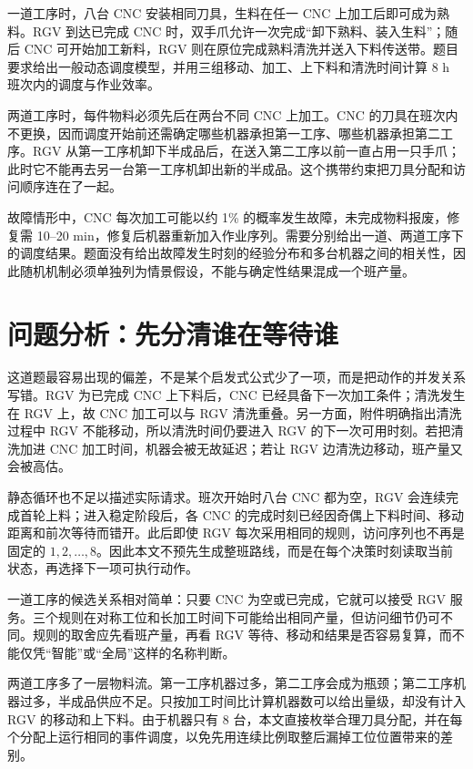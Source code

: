 \documentclass[UTF8,11pt,a4paper]{ctexart}
\begin{document}
一道工序时，八台 CNC 安装相同刀具，生料在任一 CNC 上加工后即可成为熟料。RGV 到达已完成 CNC 时，双手爪允许一次完成“卸下熟料、装入生料”；随后 CNC 可开始加工新料，RGV 则在原位完成熟料清洗并送入下料传送带。题目要求给出一般动态调度模型，并用三组移动、加工、上下料和清洗时间计算 8 h 班次内的调度与作业效率。

两道工序时，每件物料必须先后在两台不同 CNC 上加工。CNC 的刀具在班次内不更换，因而调度开始前还需确定哪些机器承担第一工序、哪些机器承担第二工序。RGV 从第一工序机卸下半成品后，在送入第二工序以前一直占用一只手爪；此时它不能再去另一台第一工序机卸出新的半成品。这个携带约束把刀具分配和访问顺序连在了一起。

故障情形中，CNC 每次加工可能以约 1\% 的概率发生故障，未完成物料报废，修复需 10--20 min，修复后机器重新加入作业序列。需要分别给出一道、两道工序下的调度结果。题面没有给出故障发生时刻的经验分布和多台机器之间的相关性，因此随机机制必须单独列为情景假设，不能与确定性结果混成一个班产量。

\section{问题分析：先分清谁在等待谁}

这道题最容易出现的偏差，不是某个启发式公式少了一项，而是把动作的并发关系写错。RGV 为已完成 CNC 上下料后，CNC 已经具备下一次加工条件；清洗发生在 RGV 上，故 CNC 加工可以与 RGV 清洗重叠。另一方面，附件明确指出清洗过程中 RGV 不能移动，所以清洗时间仍要进入 RGV 的下一次可用时刻。若把清洗加进 CNC 加工时间，机器会被无故延迟；若让 RGV 边清洗边移动，班产量又会被高估。

静态循环也不足以描述实际请求。班次开始时八台 CNC 都为空，RGV 会连续完成首轮上料；进入稳定阶段后，各 CNC 的完成时刻已经因奇偶上下料时间、移动距离和前次等待而错开。此后即使 RGV 每次采用相同的规则，访问序列也不再是固定的 $1,2,\ldots,8$。因此本文不预先生成整班路线，而是在每个决策时刻读取当前状态，再选择下一项可执行动作。

一道工序的候选关系相对简单：只要 CNC 为空或已完成，它就可以接受 RGV 服务。三个规则在对称工位和长加工时间下可能给出相同产量，但访问细节仍可不同。规则的取舍应先看班产量，再看 RGV 等待、移动和结果是否容易复算，而不能仅凭“智能”或“全局”这样的名称判断。

两道工序多了一层物料流。第一工序机器过多，第二工序会成为瓶颈；第二工序机器过多，半成品供应不足。只按加工时间比计算机器数可以给出量级，却没有计入 RGV 的移动和上下料。由于机器只有 8 台，本文直接枚举合理刀具分配，并在每个分配上运行相同的事件调度，以免先用连续比例取整后漏掉工位位置带来的差别。
\end{document}
